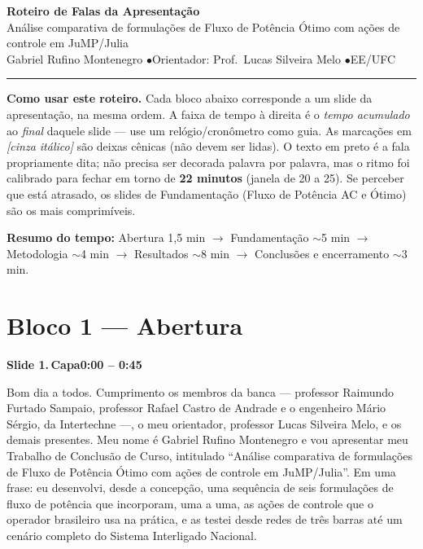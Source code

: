 \documentclass[11pt,a4paper]{article}
\newcommand{\slide}[3]{%
  \bigskip
  \noindent\colorbox{chipbg}{\parbox{\dimexpr\linewidth-2\fboxsep\relax}{%
    \textbf{\textcolor{ufcblue}{#1}}\,\textbf{#2}\hfill\textbf{\textcolor{ufcblue}{#3}}}}\par
  \nopagebreak\medskip
}
\newcommand{\cue}[1]{{\color{cue}\itshape[#1]}}
\begin{document}
\begin{center}
    {\LARGE\bfseries\textcolor{ufcblue}{Roteiro de Falas da Apresentação}}\\[0.3em]
    {\large Análise comparativa de formulações de Fluxo de Potência Ótimo com ações de controle em JuMP/Julia}\\[0.2em]
    {\normalsize Gabriel Rufino Montenegro \quad$\bullet$\quad Orientador: Prof.\ Lucas Silveira Melo \quad$\bullet$\quad EE/UFC}
\end{center}

\rule{\linewidth}{0.6pt}

\textbf{Como usar este roteiro.} Cada bloco abaixo corresponde a um slide da apresentação, na mesma ordem. A faixa de tempo à direita é o \emph{tempo acumulado} ao \emph{final} daquele slide --- use um relógio/cronômetro como guia. As marcações em \cue{cinza itálico} são deixas cênicas (não devem ser lidas). O texto em preto é a fala propriamente dita; não precisa ser decorada palavra por palavra, mas o ritmo foi calibrado para fechar em torno de \textbf{22 minutos} (janela de 20 a 25). Se perceber que está atrasado, os slides de Fundamentação (Fluxo de Potência AC e Ótimo) são os mais comprimíveis.

\medskip
\textbf{Resumo do tempo:} Abertura 1{,}5 min $\to$ Fundamentação $\sim$5 min $\to$ Metodologia $\sim$4 min $\to$ Resultados $\sim$8 min $\to$ Conclusões e encerramento $\sim$3 min.

\section*{\textcolor{ufcblue}{Bloco 1 --- Abertura}}

\slide{Slide 1.}{Capa}{0:00 -- 0:45}
Bom dia a todos. Cumprimento os membros da banca --- professor Raimundo Furtado Sampaio, professor Rafael Castro de Andrade e o engenheiro Mário Sérgio, da Intertechne ---, o meu orientador, professor Lucas Silveira Melo, e os demais presentes. Meu nome é Gabriel Rufino Montenegro e vou apresentar meu Trabalho de Conclusão de Curso, intitulado ``Análise comparativa de formulações de Fluxo de Potência Ótimo com ações de controle em JuMP/Julia''. Em uma frase: eu desenvolvi, desde a concepção, uma sequência de seis formulações de fluxo de potência que incorporam, uma a uma, as ações de controle que o operador brasileiro usa na prática, e as testei desde redes de três barras até um cenário completo do Sistema Interligado Nacional.
\end{document}
